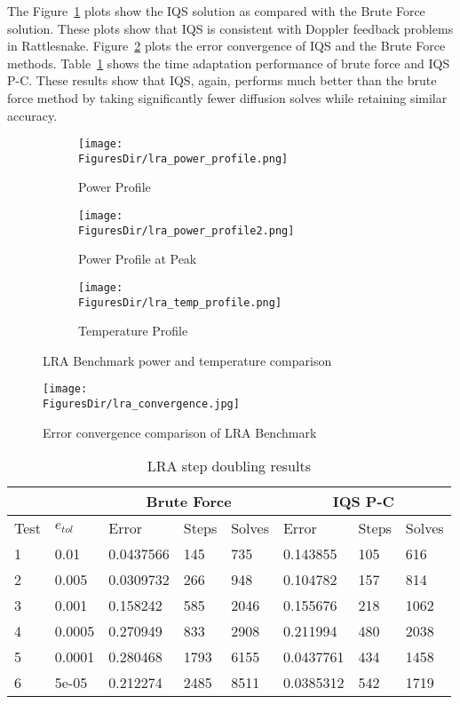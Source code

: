 \documentclass[12pt]{scrartcl}
\newcommand{\fig}[1]{Figure~\ref{#1}}                      %
\newcommand{\tbl}[1]{Table~\ref{#1}}                     %
\newcommand{\FiguresDir}{./figs}
\begin{document}
The \fig{fig:LRA_plots} plots show the IQS  solution as compared with the Brute Force solution.    These plots show that IQS is consistent with Doppler feedback problems in Rattlesnake.  \fig{fig:lra_conv} plots the error convergence of IQS and the Brute Force methods. \tbl{tab:LRAdt2} shows the time adaptation performance of brute force and IQS P-C.  These results show that IQS, again, performs much better than the brute force method by taking significantly fewer diffusion solves while retaining similar accuracy.

\begin{figure}[!htbp]
\begin{center}
\begin{subfigure}[!htbp]{0.49\textwidth}
\texttt{[image: \\FiguresDir/lra\_power\_profile.png]}
\caption{Power Profile}
\end{subfigure}
\begin{subfigure}[!htbp]{0.49\textwidth}
\texttt{[image: \\FiguresDir/lra\_power\_profile2.png]}
\caption{Power Profile at Peak}
\end{subfigure}
\begin{subfigure}[!htbp]{0.49\textwidth}
\texttt{[image: \\FiguresDir/lra\_temp\_profile.png]}
\caption{Temperature Profile}
\end{subfigure}
\caption{LRA Benchmark power and temperature comparison}
\label{fig:LRA_plots}
\end{center}
\end{figure}

\begin{figure}[!htbp]
\centering
\texttt{[image: \\FiguresDir/lra\_convergence.jpg]}
\caption{Error convergence comparison of LRA Benchmark}
\label{fig:lra_conv}
\end{figure}

\begin{table}[!htbp]
\caption{LRA step doubling results}
\label{tab:LRAdt2}
\begin{center}
\begin{tabular}{|l|l|l|l|l|l|l|l|}
\hline
  &  & \multicolumn{3}{|c|}{Brute Force} & \multicolumn{3}{|c|}{IQS P-C} \\
\hline
Test & $e_{tol}$ & Error & Steps & Solves & Error & Steps & Solves \\
\hline
1 &	 0.01 &	 0.0437566 &	 145 &	 735 &	 0.143855 &	 105 &	 616 \\ 
2 &	 0.005 &	 0.0309732 &	 266 &	 948 &	 0.104782 &	 157 &	 814 \\ 
3 &	 0.001 &	 0.158242 &	 585 &	 2046 &	 0.155676 &	 218 &	 1062 \\ 
4 &	 0.0005 &	 0.270949 &	 833 &	 2908 &	 0.211994 &	 480 &	 2038 \\ 
5 &	 0.0001 &	 0.280468 &	 1793 &	 6155 &	 0.0437761 &	 434 &	 1458 \\ 
6 &	 5e-05 &	 0.212274 &	 2485 &	 8511 &	 0.0385312 &	 542 &	 1719 \\ 
\hline
\end{tabular}
\end{center}
\end{table}
\end{document}
